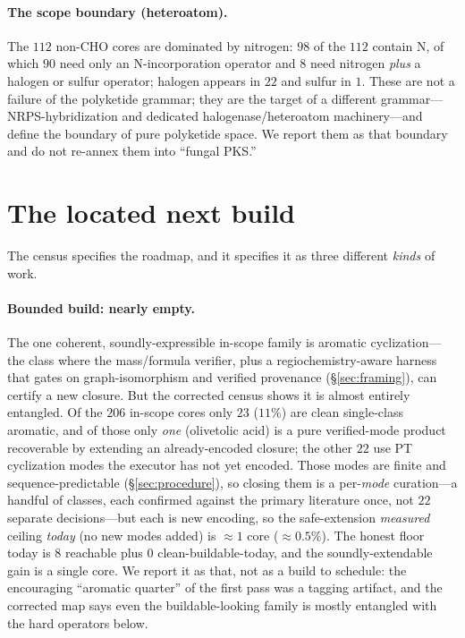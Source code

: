 \documentclass[11pt]{article}
\begin{document}
\paragraph{The scope boundary (heteroatom).} The $112$ non-CHO cores are dominated by nitrogen:
$98$ of the $112$ contain N, of which $90$ need only an N-incorporation operator and $8$ need nitrogen
\emph{plus} a halogen or sulfur operator; halogen appears in $22$ and sulfur in $1$. These are not a failure of the polyketide grammar; they are the target of a
different grammar---NRPS-hybridization and dedicated halogenase/heteroatom machinery---and define the
boundary of pure polyketide space. We report them as that boundary and do not re-annex them into
``fungal PKS.''

\section{The located next build}
\label{sec:roadmap}
The census specifies the roadmap, and it specifies it as three different \emph{kinds} of work.

\paragraph{Bounded build: nearly empty.} The one coherent, soundly-expressible in-scope family is
aromatic cyclization---the class where the mass/formula verifier, plus a regiochemistry-aware harness
that gates on graph-isomorphism and verified provenance (\S\ref{sec:framing}), can certify a new
closure. But the corrected census shows it is almost entirely entangled. Of the $206$ in-scope cores
only $23$ ($11\%$) are clean single-class aromatic, and of those only \emph{one} (olivetolic acid) is a
pure verified-mode product recoverable by extending an already-encoded closure; the other $22$ use PT
cyclization modes the executor has not yet encoded. Those modes are finite and sequence-predictable
(\S\ref{sec:procedure}), so closing them is a per-\emph{mode} curation---a handful of classes, each
confirmed against the primary literature once, not $22$ separate decisions---but each is new encoding,
so the safe-extension \emph{measured} ceiling \emph{today} (no new modes added) is $\approx$$1$ core
($\approx$$0.5\%$). The honest floor
today is $8$ reachable plus $0$ clean-buildable-today, and the soundly-extendable gain is a single
core. We report it as that, not as a build to schedule: the encouraging ``aromatic quarter'' of the
first pass was a tagging artifact, and the corrected map says even the buildable-looking family is
mostly entangled with the hard operators below.
\end{document}
